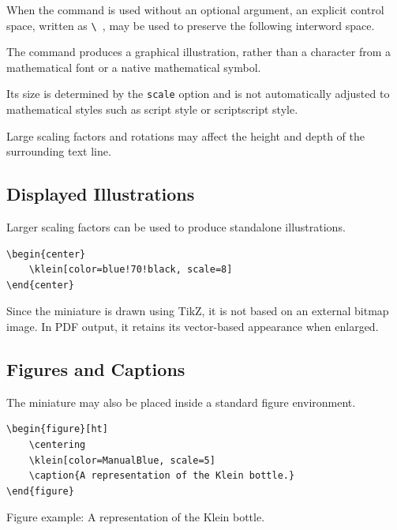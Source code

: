 \documentclass[12pt,a4paper]{article}
\begin{document}
When the command is used without an optional
argument, an explicit control space, written as
\verb|\ |, may be used to preserve the following
interword space.

The command produces a graphical illustration,
rather than a character from a mathematical font
or a native mathematical symbol.

Its size is determined by the \texttt{scale}
option and is not automatically adjusted to
mathematical styles such as script style or
scriptscript style.

Large scaling factors and rotations may affect
the height and depth of the surrounding text line.

\subsection{Displayed Illustrations}

Larger scaling factors can be used to produce
standalone illustrations.

\begin{verbatim}
\begin{center}
    \klein[color=blue!70!black, scale=8]
\end{center}
\end{verbatim}

\begin{center}
    \klein[color=blue!70!black,scale=8]
\end{center}

Since the miniature is drawn using TikZ,
it is not based on an external bitmap image.
In PDF output, it retains its vector-based
appearance when enlarged.

\subsection{Figures and Captions}

The miniature may also be placed inside a
standard figure environment.

\begin{verbatim}
\begin{figure}[ht]
    \centering
    \klein[color=ManualBlue, scale=5]
    \caption{A representation of the Klein bottle.}
\end{figure}
\end{verbatim}

\begin{center}
    \klein[color=ManualBlue,scale=5]
    \par\vspace{0.2cm}
    {\small Figure example: A representation
    of the Klein bottle.}
\end{center}
\end{document}

